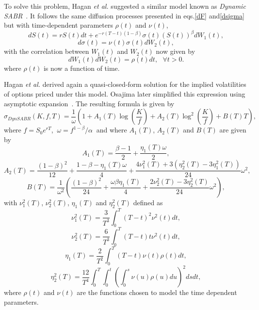 To solve this problem, Hagan \textit{et al.} suggested a similar model known as \emph{Dynamic SABR}~\citep{Hagan}. It follows the same diffusion processes presented in eqs.\eqref{dF} and\eqref{dsigma} but with time-dependent parameters $\rho(t)$ and $\nu(t)$,
\begin{equation}\label{dF2}
\boxed{dS(t)=rS(t)dt+e^{-r(T-t)(1-\beta)}\sigma(t) (S(t))^\beta dW_1(t),}
\end{equation}
\begin{equation}\label{dsigma2}
\boxed{d\sigma(t)=\nu(t)\sigma(t) dW_2(t),}
\end{equation}
\noindent with the correlation between $W_1(t)$ and $W_2(t)$ now given by
\begin{equation}
dW_1(t)dW_2(t)=\rho(t) dt, \ \ \ \forall t>0.
\end{equation}
\noindent where $\rho(t)$ is now a function of time.



Hagan \textit{et al.} derived again a quasi-closed-form solution for the implied volatilities of options priced under this model. Osajima later simplified this expression using asymptotic expansion~\citep{Osajima}. The resulting formula is given by
\begin{equation}\label{dynsabr}
\sigma_{DynSABR}(K,f,T)=\frac{1}{\omega}\left(1+A_1(T)\log\left(\frac{K}{f}\right)+A_2(T)\log^2\left(\frac{K}{f}\right)+B(T)T\right),
\end{equation}
\noindent where $f=S_0e^{rT}$, $\ \omega=f^{1-\beta}/\alpha\ $ and where $A_1(T)$, $A_2(T)$ and $B(T)$ are given by
\begin{equation}
A_1(T)=\frac{\beta-1}{2}+\frac{\eta_1(T)\omega}{2},
\end{equation}
\begin{equation}
A_2(T)=\frac{(1-\beta)^2}{12}+\frac{1-\beta-\eta_1(T)\omega}{4}+\frac{4\nu_1^2(T)+3(\eta_2^2(T)-3\eta_1^2(T))}{24}\omega^2,
\end{equation}
\begin{equation}
B(T)=\frac{1}{\omega^2}\left(\frac{(1-\beta)^2}{24}+\frac{\omega\beta\eta_1(T)}{4}+\frac{2\nu_2^2(T)-3\eta_2^2(T)}{24}\omega^2\right),
\end{equation}
\noindent with $\nu_1^2(T)$, $\nu_2^2(T)$, $\eta_1(T)$ and $\eta_2^2(T)$ defined as
\begin{equation}\label{nu1}
\nu_1^2(T)=\frac{3}{T^3}\int_0^T(T-t)^2\nu^2(t)dt,
\end{equation}
\begin{equation}
\nu_2^2(T)=\frac{6}{T^3}\int_0^T(T-t)t\nu^2(t)dt,
\end{equation}
\begin{equation}
\eta_1(T)=\frac{2}{T^2}\int_0^T(T-t)\nu(t)\rho(t)dt,
\end{equation}
\begin{equation}\label{eta2}
\eta_2^2(T)=\frac{12}{T^4}\int_0^T\int_0^t\left(\int_0^s\nu(u)\rho(u)du\right)^2dsdt,
\end{equation}
\noindent where $\rho(t)$ and $\nu(t)$ are the functions chosen to model the time dependent parameters.



